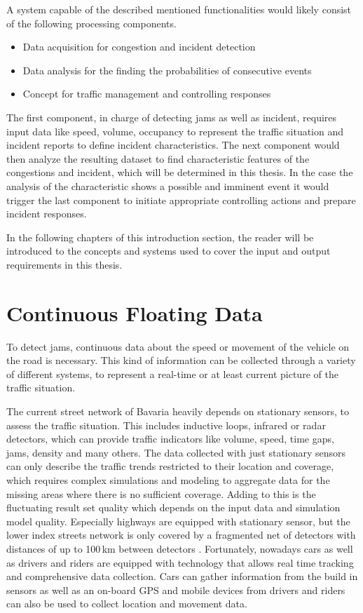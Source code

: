 \documentclass[a4paper,headsepline,footsepline,fontsize=11pt,BCOR=12mm,DIV=12]{report}
\begin{document}
A system capable of the described mentioned functionalities would likely consist of the following processing components.

\begin{itemize}
  \item Data acquisition for congestion and incident detection
  \item Data analysis for the finding the probabilities of consecutive events
  \item Concept for traffic management and controlling responses
\end{itemize}

The first component, in charge of detecting \glspl{jam} as well as incident, requires input data like speed, volume, occupancy to represent the traffic situation and incident reports to define incident characteristics. The next component would then analyze the resulting dataset to find characteristic features of the congestions and incident, which will be determined in this thesis. In the case the analysis of the characteristic shows a possible and imminent event it would trigger the last component to initiate appropriate controlling actions and prepare incident responses.

In the following chapters of this introduction section, the reader will be introduced to the concepts and systems used to cover the input and output requirements in this thesis.

\section{Continuous Floating Data}

To detect \glspl{jam}, continuous data about the speed or movement of the vehicle on the road is necessary. This kind of information can be collected through a variety of different systems, to represent a real-time or at least current picture of the traffic situation. 

The current street network of Bavaria heavily depends on stationary sensors, to assess the traffic situation. This includes inductive loops, infrared or radar detectors, which can provide traffic indicators like volume, speed, time gaps, jams, density and many others. The data collected with just stationary sensors can only describe the traffic trends restricted to their location and coverage, which requires complex simulations and modeling to aggregate data for the missing areas where there is no sufficient coverage. Adding to this is the fluctuating result set quality which depends on the input data and simulation model quality. Especially highways are equipped with stationary sensor, but the lower index streets network is only covered by a fragmented net of detectors with distances of up to 100\,km between detectors \cite{INDRIX2015}. Fortunately, nowadays cars as well as drivers and riders are equipped with technology that allows real time tracking and comprehensive data collection. Cars can gather information from the build in sensors as well as an on-board GPS and mobile devices from drivers and riders can also be used to collect location and movement data. \cite{Randelhoff2016}
\end{document}
